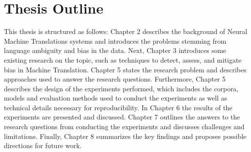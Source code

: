 \section{Thesis Outline}
\label{sec:Introduction:Outline}
This thesis is structured as follows: Chapter 2 describes the background of Neural Machine Translations
systems and introduces the problems stemming from language ambiguity and bias in the data. Next, Chapter 3 introduces some existing research on the topic, such as techniques to detect, assess, and mitigate bias in Machine Translation. Chapter 5 states the research problem and describes approaches used to answer the research questions. Furthermore, Chapter 5 describes the design of the experiments performed, which includes the corpora, models and evaluation methods used to conduct the experiments as well as technical details necessary for reproducibility. In Chapter 6 the results of the experiments are presented and discussed. Chapter 7 outlines the answers to the research questions from conducting the experiments and discusses challenges and limitations. Finally, Chapter 8 summarizes the key findings and proposes possible directions for future work.














